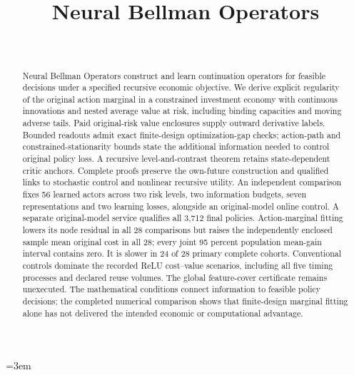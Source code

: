 \documentclass[ecta,nameyear,draft]{econsocart}
\begin{document}
\begin{frontmatter}
\title{Neural Bellman Operators}
\begin{aug}
\author[id=au1,addressref={add1}]{~}
\address[id=add1]{Peking University}
\end{aug}
\begin{abstract}
Neural Bellman Operators construct and learn continuation operators for feasible
decisions under a specified recursive economic objective. We derive explicit
regularity of the original action marginal in a constrained investment economy
with continuous innovations and nested average value at risk, including binding
capacities and moving adverse tails. Paid original-risk value enclosures supply
outward derivative labels. Bounded readouts admit exact finite-design
optimization-gap checks; action-path and constrained-stationarity bounds
state the additional information needed to control original policy loss.
A recursive level-and-contrast theorem retains state-dependent critic anchors.
Complete proofs preserve the own-future construction and qualified links to
stochastic control and nonlinear recursive utility. An independent comparison
fixes 56 learned actors across two risk levels, two information budgets,
seven representations and two learning losses, alongside an original-model
online control. A separate
original-model service qualifies all 3,712 final policies. Action-marginal
fitting lowers its node residual in all 28 comparisons but raises the
independently enclosed sample mean original cost in all 28; every joint
95 percent population mean-gain interval contains zero. It is slower in
24 of 28 primary complete cohorts. Conventional controls dominate the recorded
ReLU cost--value scenarios, including all five timing processes and declared
reuse volumes. The global feature-cover certificate remains unexecuted.
The mathematical conditions connect information to feasible policy decisions;
the completed numerical comparison shows that finite-design marginal fitting
alone has not delivered the intended economic or computational advantage.
\end{abstract}
\begin{keyword}
\end{keyword}
\end{frontmatter}









\begingroup\emergencystretch=3em

\endgroup
\end{document}
